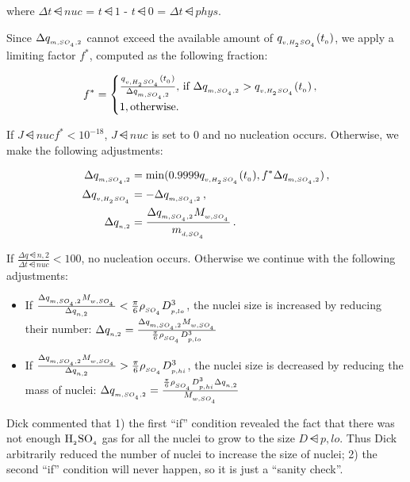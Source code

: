 where $\Delta t\dsub{nuc}$ = $t\dsub{1}$ - $t\dsub{0}$ = $\Delta t\dsub{phys}$.

Since $\Delta q_{_{m,SO_{_4},2}}$ cannot exceed the available amount of
$q_{_{v,H_{_2}SO_{_4}}}(t_{_{0}})$, we apply a limiting factor $f^*$, computed
as the following fraction:

\begin{equation}
  f^* = \begin{cases}
        \frac{q_{_{v,H_{_2}SO_{_4}}}(t_{_{0}})}{\Delta q_{_{m,SO_{_4},2}}}, \, \text{if $\Delta q_{_{m,SO_{_4},2}} > q_{_{v,H_{_2}SO_{_4}}}(t_{_{0}})$} \,, \\
        1, \text{otherwise.} \\
  \end{cases}
\end{equation}

If $J\dsub{nuc} f^* < 10^{-18}$, $J\dsub{nuc}$ is set to $0$ and no nucleation
occurs. Otherwise, we make the following adjustments:

\begin{align}
  \Delta q_{_{m,SO_{_4},2}} &= \min ( 0.9999q_{_{v,H_{_2}SO_{_4}}}(t_{_{0}}), f^* \Delta q_{_{m,SO_{_4},2}} ) \,, \\
  \Delta q_{_{v,H_{_2}SO_{_4}}} &= - \Delta q_{_{m,SO_{_4},2}} \,, \\
  \Delta q_{_{n,2}} &= \frac{\Delta q_{_{m,SO_{_4},2}} M_{_{w,SO_{_4}}}}{m_{_{d,SO_{_4}}}} \,.
\end{align}

If $\frac{\Delta q\dsub{n,2}}{\Delta t\dsub{nuc}} < 100$, no nucleation occurs.
Otherwise we continue with the following adjustments:

\begin{itemize}
  \item If $\frac{\Delta q_{_{m,SO_{_4},2}} M_{_{w,SO_{_4}}}}{\Delta q_{_{n,2}}} <
        \frac{\pi}{6} \rho_{_{SO_{_4}}} D_{_{p,lo}}^3$, the nuclei size is
        increased by reducing their number: $\Delta q_{_{n,2}} =
        \frac{\Delta q_{_{m,SO_{_4},2}} M_{_{w,SO_{_4}}}}{\frac{\pi}{6} \rho_{_{SO_{_4}}} D_{_{p,lo}}^3}$
  \item If $\frac{\Delta q_{_{m,SO_{_4},2}} M_{_{w,SO_{_4}}}}{\Delta q_{_{n,2}}} >
        \frac{\pi}{6} \rho_{_{SO_{_4}}} D_{_{p,hi}}^3$, the nuclei size is
        decreased by reducing the mass of nuclei:
        $\Delta q_{_{m,SO_{_4},2}} = \frac{\frac{\pi}{6} \rho_{_{SO_{_4}}} D_{_{p,hi}}^3 \Delta q_{_{n,2}}}{M_{_{w,SO_{_4}}}}$
\end{itemize}

Dick commented that 1) the first ``if'' condition revealed the fact that
there was not enough $\rm H_{_2}SO_{_4}$ gas for all the nuclei to grow to the size
$D\dsub{p,lo}$. Thus Dick arbitrarily reduced the number of nuclei to
increase the size of nuclei; 2) the second ``if'' condition will never
happen, so it is just a ``sanity check''.

